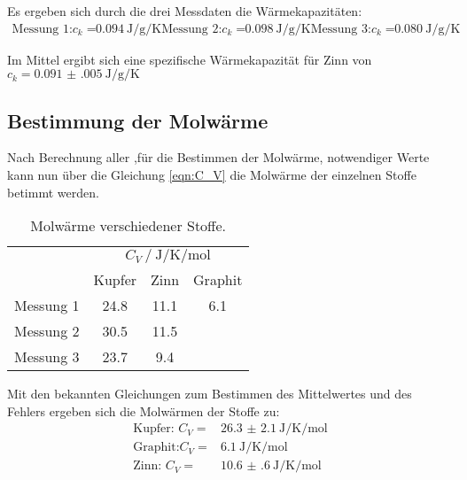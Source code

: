 Es ergeben sich durch die drei Messdaten die Wärmekapazitäten:
\begin{align*}
\text{Messung 1:}c_k = & \SI{0.094}{\joule\per\g\per\kelvin}    
\text{Messung 2:}c_k = & \SI{0.098}{\joule\per\g\per\kelvin}
\text{Messung 3:}c_k = & \SI{0.080}{\joule\per\g\per\kelvin}
\end{align*}

Im Mittel ergibt sich eine spezifische Wärmekapazität für Zinn von $c_k=\SI{0.091(005)}{\joule\per\g\per\kelvin}$

\subsection{Bestimmung der Molwärme}
Nach Berechnung aller ,für die Bestimmen der Molwärme, notwendiger Werte kann nun über die Gleichung \eqref{eqn:C_V} die Molwärme der einzelnen Stoffe betimmt werden. 




\begin{table}
    \centering
    \caption{Molwärme verschiedener Stoffe.}
    \label{tab:m}
    \begin{tabular}{c| S S S }
        \toprule
        & \\
        & {Kupfer} & {Zinn} & {Graphit} \\
        \midrule
        Messung 1 & 24.8 & 11.1 & 6.1 \\
        Messung 2 & 30.5 & 11.5  &  \\
        Messung 3 & 23.7 & 9.4 & \\
        \bottomrule 
    \end{tabular}
\end{table}

Mit den bekannten Gleichungen zum Bestimmen des Mittelwertes und des Fehlers ergeben sich die Molwärmen der Stoffe zu:
\begin{align*}
\text{Kupfer: } C_V=&\SI{26.3(21)}{\joule\per\kelvin\per\mol}  \\
\text{Graphit:} C_V=&\SI{6.1}{\joule\per\kelvin\per\mol}  \\
\text{Zinn: }   C_V=&\SI{10.6(6)}{\joule\per\kelvin\per\mol}
\end{align*}


%
